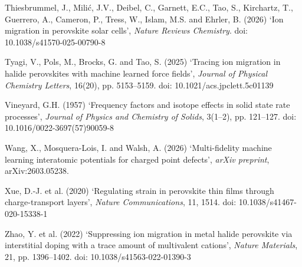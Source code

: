 \documentclass[11pt,a4paper]{article}
\begin{document}
\begin{list}{}{\setlength{\itemindent}{-1.2em}\setlength{\leftmargin}{1.2em}\setlength{\itemsep}{0.25em}\small}
\item Thiesbrummel, J., Mili\'c, J.V., Deibel, C., Garnett, E.C., Tao, S., Kirchartz,
T., Guerrero, A., Cameron, P., Tress, W., Islam, M.S. and Ehrler, B. (2026) `Ion
migration in perovskite solar cells', \emph{Nature Reviews Chemistry}. doi:
10.1038/s41570-025-00790-8

\item Tyagi, V., Pols, M., Brocks, G. and Tao, S. (2025) `Tracing ion migration in
halide perovskites with machine learned force fields', \emph{Journal of Physical
Chemistry Letters}, 16(20), pp. 5153--5159. doi: 10.1021/acs.jpclett.5c01139

\item Vineyard, G.H. (1957) `Frequency factors and isotope effects in solid state rate
processes', \emph{Journal of Physics and Chemistry of Solids}, 3(1--2), pp. 121--127.
doi: 10.1016/0022-3697(57)90059-8

\item Wang, X., Mosquera-Lois, I. and Walsh, A. (2026) `Multi-fidelity machine
learning interatomic potentials for charged point defects', \emph{arXiv preprint},
arXiv:2603.05238.

\item Xue, D.-J. et al. (2020) `Regulating strain in perovskite thin films through
charge-transport layers', \emph{Nature Communications}, 11, 1514. doi:
10.1038/s41467-020-15338-1

\item Zhao, Y. et al. (2022) `Suppressing ion migration in metal halide perovskite via
interstitial doping with a trace amount of multivalent cations', \emph{Nature
Materials}, 21, pp. 1396--1402. doi: 10.1038/s41563-022-01390-3

\end{list}
\end{document}
